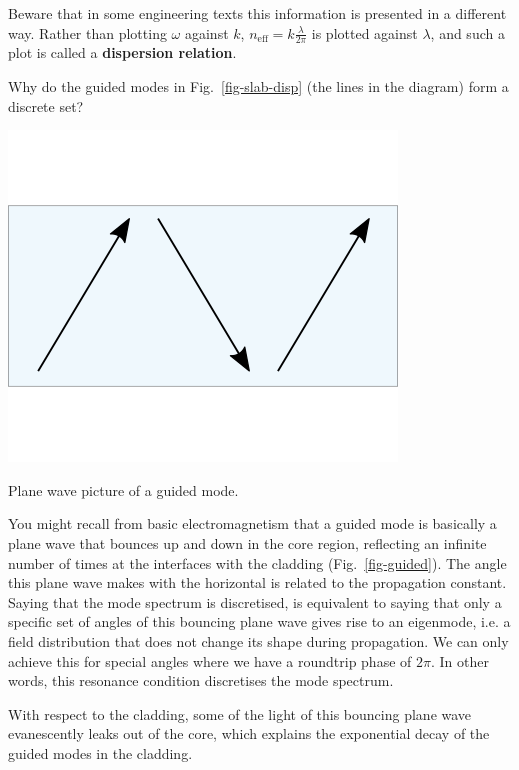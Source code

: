 Beware that in some engineering texts this information is presented in a different way. Rather than plotting $\omega$ against $k$, $n_\mathrm{eff}= k \frac {\lambda}{ 2\pi}$ is plotted against $\lambda$, and such a plot is called a \textbf{dispersion relation}.

\begin{cue}
Why do the guided modes in Fig.~\ref{fig-slab-disp} (the lines in the diagram) form a discrete set?
\end{cue}

\begin{marginfigure}
\centering
\includegraphics{symmetry/figures/guided}
\caption{Plane wave picture of a guided mode.}
\label{fig-guided}
\end{marginfigure}

You might recall from basic electromagnetism that a guided mode is basically a plane wave that bounces up and down in the core region, reflecting an infinite number of times at the interfaces with the cladding (Fig.~\ref{fig-guided}). The angle this plane wave makes with the horizontal is related to the propagation constant. Saying that the mode spectrum is discretised, is equivalent to saying that only a specific set of angles of this bouncing plane wave gives rise to an eigenmode, i.e. a field distribution that does not change its shape during propagation. We can only achieve this for special angles where we have a roundtrip phase of $2 \pi$. In other words, this resonance condition discretises the mode spectrum.

With respect to the cladding, some of the light of this bouncing plane wave evanescently leaks out of the core, which explains the exponential decay of the guided modes in the cladding.


